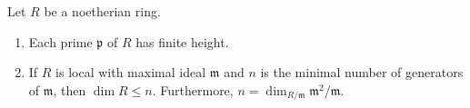 Let $R$ be a noetherian ring.
\begin{enumerate}[label=(\alph*)]
	\item Each prime $\mathfrak{p}$ of $R$ has finite height.
	\item If $R$ is local with maximal ideal $\mathfrak{m}$ and $n$ is the minimal
		number of generators of $\mathfrak{m}$, then $\dim R \leq n$. Furthermore,
		$n = \dim_{R/\mathfrak{m}}\mathfrak{m}^2/\mathfrak{m}$.
\end{enumerate}
